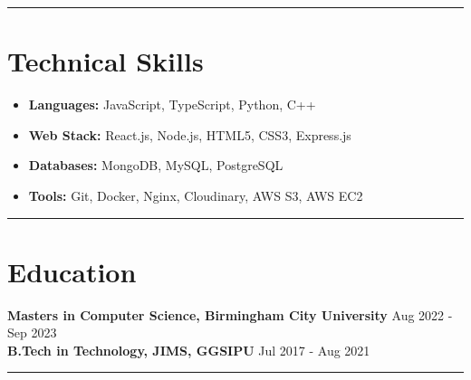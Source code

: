 \documentclass[a4paper,10pt]{article}
\newcommand{\sectdivider}{\noindent\rule{\linewidth}{0.5pt}}
\begin{document}
\sectdivider
\vspace{-0.4em}

\section*{\color{myblue} Technical Skills}
\begin{multicols}{2}
\begin{itemize}
    \item \textbf{Languages:} JavaScript, TypeScript, Python, C++
    \item \textbf{Web Stack:} React.js, Node.js, HTML5, CSS3, Express.js
    \item \textbf{Databases:} MongoDB, MySQL, PostgreSQL
    \item \textbf{Tools:} Git, Docker, Nginx, Cloudinary, AWS S3, AWS EC2
\end{itemize}
\end{multicols}

\sectdivider
\vspace{-0.4em}


\section*{\color{myblue} Education}
\noindent
\textbf{Masters in Computer Science, Birmingham City University} \hfill Aug 2022 - Sep 2023 \\
\textbf{B.Tech in Technology, JIMS, GGSIPU} \hfill Jul 2017 - Aug 2021

\sectdivider
\vspace{-0.4em}
\end{document}
